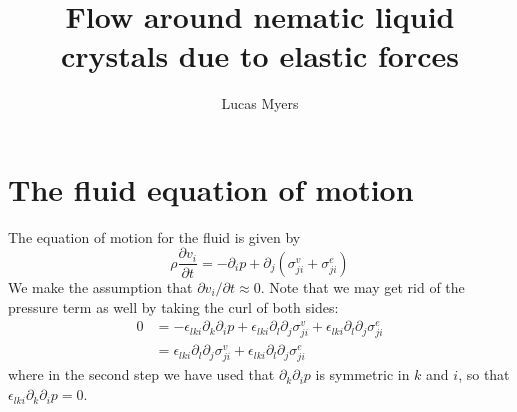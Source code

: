 \documentclass[reqno]{article}
\begin{document}
\title{Flow around nematic liquid crystals due to elastic forces}
\author{Lucas Myers}
\maketitle
	
\section{The fluid equation of motion}
The equation of motion for the fluid is given by
\begin{equation}\label{eq:fluid-eom}
	\rho \frac{\partial v_i}{\partial t} 
	= -\partial_i p 
	+ \partial_j (\sigma^v_{ji} + \sigma^{e}_{ji})
\end{equation}
We make the assumption that $\partial v_i/\partial t \approx 0$.
Note that we may get rid of the pressure term as well by taking the curl of both sides:
\begin{equation}
\begin{split}
	0 &= -\epsilon_{lki} \partial_k \partial_i p
	+ \epsilon_{lki} \partial_l \partial_j \sigma^v_{ji}
	+ \epsilon_{lki} \partial_l \partial_j \sigma^e_{ji} \\
	&= \epsilon_{lki} \partial_l \partial_j \sigma^v_{ji}
	+ \epsilon_{lki} \partial_l \partial_j \sigma^e_{ji}
\end{split}
\end{equation}
where in the second step we have used that $\partial_k \partial_i p$ is symmetric in $k$ and $i$, so that $\epsilon_{lki} \partial_k \partial_i p = 0$.
\end{document}
